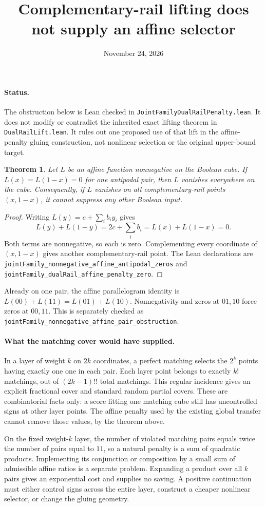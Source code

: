 \documentclass{article}
\newtheorem{theorem}{Theorem}
\begin{document}
\title{Complementary-rail lifting does not supply an affine selector}
\author{}
\date{November 24, 2026}
\maketitle

\paragraph{Status.}
The obstruction below is Lean checked in
\texttt{JointFamilyDualRailPenalty.lean}. It does not modify or contradict
the inherited exact lifting theorem in \texttt{DualRailLift.lean}.
It rules out one proposed use of that lift in the affine-penalty gluing
construction, not nonlinear selection or the original upper-bound target.

\begin{theorem}
Let $L$ be an affine function nonnegative on the Boolean cube. If
$L(x)=L(1-x)=0$ for one antipodal pair, then $L$ vanishes everywhere
on the cube. Consequently, if $L$ vanishes on all complementary-rail
points $(x,1-x)$, it cannot suppress any other Boolean input.
\end{theorem}
\begin{proof}
Writing $L(y)=c+\sum_i b_i y_i$ gives
\[
 L(y)+L(1-y)=2c+\sum_i b_i=L(x)+L(1-x)=0.
\]
Both terms are nonnegative, so each is zero. Complementing every
coordinate of $(x,1-x)$ gives another complementary-rail point.
The Lean declarations are
\texttt{jointFamily\_nonnegative\_affine\_antipodal\_zeros} and
\texttt{jointFamily\_dualRail\_affine\_penalty\_zero}.
\end{proof}

Already on one pair, the affine parallelogram identity is
$L(00)+L(11)=L(01)+L(10)$. Nonnegativity and zeros at $01,10$ force
zeros at $00,11$. This is separately checked as
\texttt{jointFamily\_nonnegative\_affine\_pair\_obstruction}.

\paragraph{What the matching cover would have supplied.}
In a layer of weight $k$ on $2k$ coordinates, a perfect matching
selects the $2^k$ points having exactly one one in each pair. Each
layer point belongs to exactly $k!$ matchings, out of $(2k-1)!!$
total matchings. This regular incidence gives an explicit fractional
cover and standard random partial covers. These are combinatorial
facts only: a score fitting one matching cube still has uncontrolled
signs at other layer points. The affine penalty used by the existing
global transfer cannot remove those values, by the theorem above.

On the fixed weight-$k$ layer, the number of violated matching pairs
equals twice the number of pairs equal to $11$, so a natural penalty
is a sum of quadratic products. Implementing its conjunction or
composition by a small sum of admissible affine ratios is a separate
problem. Expanding a product over all $k$ pairs gives an exponential
cost and supplies no saving. A positive continuation must either
control signs across the entire layer, construct a cheaper nonlinear
selector, or change the gluing geometry.
\end{document}
